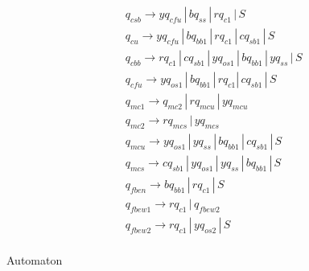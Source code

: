 \documentclass{article}
\begin{document}
\begin{mylist}
\begin{align*}
&q_{csb} \rightarrow yq_{cfu} \, | \,  bq_{ss} \, | \, rq_{c1} \, | \, S \\ 
&q_{cu} \rightarrow yq_{cfu} \, | \,  bq_{bb1} \, | \, rq_{c1} \, | \, cq_{sb1} \, | \, S \\ 
&q_{cbb} \rightarrow rq_{c1} \, | \,  cq_{sb1} \, | \, yq_{os1} \, | \, bq_{bb1} \, | \, yq_{ss} \, | \, S \\ 
&q_{cfu} \rightarrow yq_{os1} \, | \,  bq_{bb1} \, | \, rq_{c1} | \, cq_{sb1} \, | \, S\\ 
&q_{mc1} \rightarrow q_{mc2} \, | \, rq_{mcu} \, | \, yq_{mcu}\\
&q_{mc2} \rightarrow rq_{mcs} \, | \, yq_{mcs}\\
&q_{mcu} \rightarrow yq_{os1} \, | \, yq_{ss} \, | \, bq_{bb1} \, | \, cq_{sb1} \, | \, S\\
&q_{mcs} \rightarrow cq_{sb1} \, | \, yq_{os1} \, | \, yq_{ss} \, | \, bq_{bb1}\, | \, S\\
&q_{fben} \rightarrow bq_{bb1} \, | \, rq_{c1} \, | \, S\\
&q_{fbew1} \rightarrow rq_{c1} \, | \, q_{fbew2} \\
&q_{fbew2} \rightarrow rq_{c1} \, | \, yq_{os2} \, | \, S\\
\end{align*}

\newpage
{}
\item Automaton

\begin{center}


\end{center}
\end{mylist}
\end{document}
